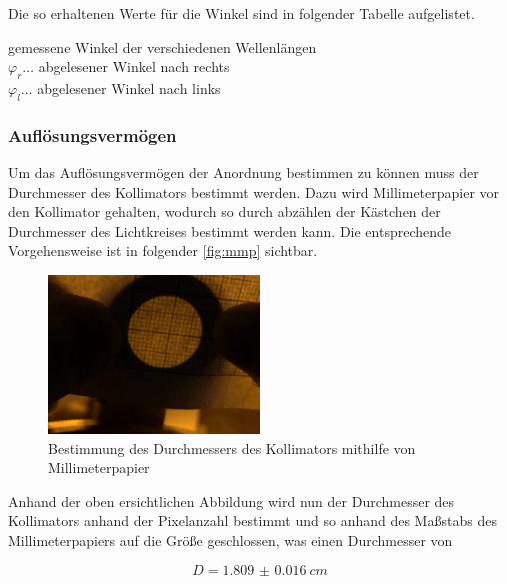 \documentclass[11pt,ngerman]{scrartcl}
\begin{document}
Die so erhaltenen Werte für die Winkel sind in folgender Tabelle aufgelistet.

\begin{table}[H]
	\caption{gemessene Winkel der verschiedenen Wellenlängen\\ $\varphi_r \dots$ abgelesener Winkel nach rechts \\ $\varphi_l \dots$ abgelesener Winkel nach links}
	\label{tab:messwinkelwellenlange}
	\centering
	
\end{table}


\subsubsection{Auflösungsvermögen}

Um das Auflösungsvermögen der Anordnung bestimmen zu können muss der Durchmesser des Kollimators bestimmt werden. Dazu wird Millimeterpapier vor den Kollimator gehalten, wodurch so durch abzählen der Kästchen der Durchmesser des Lichtkreises bestimmt werden kann. Die entsprechende Vorgehensweise ist in folgender \autoref{fig:mmp} sichtbar.

\begin{figure}[H]
	\begin{center}
		\includegraphics[width=0.5\textwidth]{mmp}
	\end{center}
	\caption{Bestimmung des Durchmessers des Kollimators mithilfe von Millimeterpapier}
	\label{fig:mmp}
\end{figure}

Anhand der oben ersichtlichen Abbildung wird nun der Durchmesser des
Kollimators anhand der Pixelanzahl bestimmt und so anhand des Maßstabs des Millimeterpapiers auf die Größe geschlossen, was einen Durchmesser von

\begin{equation}
	D = \SI{1.809(16)}{cm}
	\label{eq:durchmesser}
\end{equation}
\end{document}
